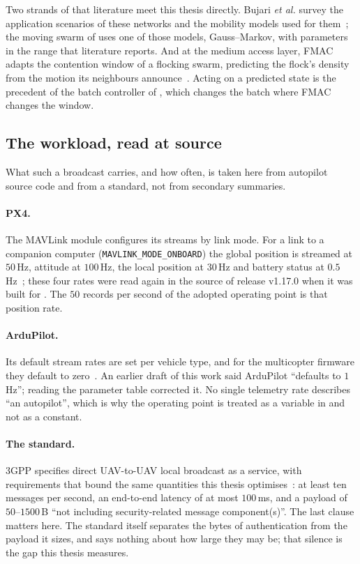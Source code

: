 Two strands of that literature meet this thesis directly. Bujari \emph{et al.} survey the
application scenarios of these networks and the mobility models used for
them~\cite{bujari2017fanet}; the moving swarm of  uses one of those
models, Gauss--Markov, with parameters in the range that literature reports. And at the medium
access layer, FMAC adapts the contention window of a flocking swarm, predicting the flock's
density from the motion its neighbours announce~\cite{huang2021fmac}. Acting on a predicted
state is the precedent of the batch controller of , which changes the batch
where FMAC changes the window.

\subsection{The workload, read at source}

What such a broadcast carries, and how often, is taken here from autopilot source code and from
a standard, not from secondary summaries.

\paragraph{PX4.} The MAVLink module configures its streams by link mode. For a link to a
companion computer (\texttt{MAVLINK\_MODE\_ONBOARD}) the global position is streamed at
$50$\,Hz, attitude at $100$\,Hz, the local position at $30$\,Hz and battery status at
$0.5$\,Hz~\cite{px4_mavlink_streams}; these four rates were read again in the source of release
v1.17.0 when it was built for . The $50$ records per second of the adopted
operating point is that position rate.

\paragraph{ArduPilot.} Its default stream rates are set per vehicle type, and for the
multicopter firmware they default to zero~\cite{ardupilot_stream_rates}. An earlier draft of this work said ArduPilot ``defaults to
$1$\,Hz''; reading the parameter table corrected it. No single telemetry rate describes
``an autopilot'', which is why the operating point is treated as a variable in
 and not as a constant.

\paragraph{The standard.} 3GPP specifies direct UAV-to-UAV local broadcast as a service, with
requirements that bound the same quantities this thesis optimises~\cite{3gpp_ts22125}: at least
ten messages per second, an end-to-end latency of at most $100$\,ms, and a payload of
$50$--$1500$\,B ``not including security-related message component(s)''. The last clause matters
here. The standard itself separates the bytes of authentication from the payload it sizes, and
says nothing about how large they may be; that silence is the gap this thesis measures.

